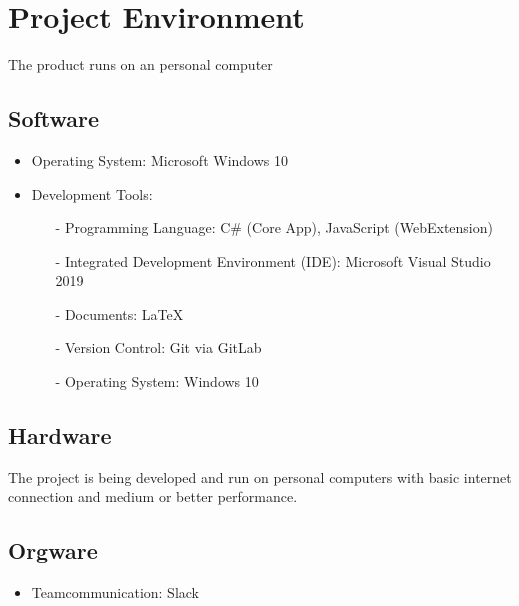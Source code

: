 \chapter{Project Environment}
\label{ch:environment}

The product runs on an personal computer 

\section{Software}
\begin{itemize}
\item Operating System: Microsoft Windows 10

\item Development Tools:
	\begin{itemize}
	\item[-] Programming Language: C\# (Core App), JavaScript (WebExtension)
	\item[-] Integrated Development Environment (IDE): Microsoft Visual Studio 2019
	\item[-] Documents: LaTeX
	\item[-] Version Control: Git via GitLab
	\item[-] Operating System: Windows 10
	\end{itemize}
\end{itemize}
\section{Hardware}

The project is being developed and run on personal computers with basic internet connection and medium or better performance.

\section{Orgware}
\begin{itemize}
\item Teamcommunication: Slack
\end{itemize}